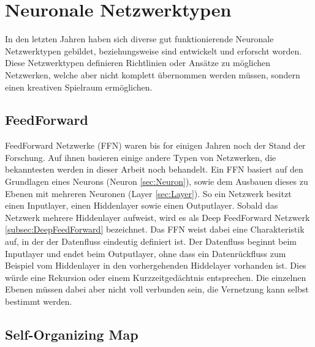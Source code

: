 
\section{Neuronale Netzwerktypen}

In den letzten Jahren haben sich diverse gut funktionierende Neuronale Netzwerktypen gebildet, beziehungsweise sind entwickelt und erforscht worden. 
Diese Netzwerktypen definieren Richtlinien oder Ansätze zu möglichen Netzwerken, welche aber nicht komplett übernommen werden müssen, sondern einen kreativen Spielraum ermöglichen. \\


\subsection{FeedForward}
\label{subsec:FeedForward}

FeedForward Netzwerke (FFN) waren bis for einigen Jahren noch der Stand der Forschung.
Auf ihnen basieren einige andere Typen von Netzwerken, die bekanntesten werden in dieser Arbeit noch behandelt.
Ein FFN basiert auf den Grundlagen eines Neurons (Neuron \ref{sec:Neuron}), sowie dem Ausbauen dieses zu Ebenen mit mehreren Neuronen (Layer \ref{sec:Layer}).
So ein Netzwerk besitzt einen Inputlayer, einen Hiddenlayer sowie einen Outputlayer.
Sobald das Netzwerk mehrere Hiddenlayer aufweist, wird es als Deep FeedForward Netzwerk \ref{subsec:DeepFeedForward} bezeichnet.
Das FFN weist dabei eine Charakteristik auf, in der der Datenfluss eindeutig definiert ist. 
Der Datenfluss beginnt beim Inputlayer und endet beim Outputlayer, ohne dass ein Datenrückfluss zum Beispiel vom Hiddenlayer in den vorhergehenden Hiddelayer vorhanden ist.
Dies würde eine Rekursion oder einem Kurzzeitgedächtnis entsprechen.
Die einzelnen Ebenen müssen dabei aber nicht voll verbunden sein, die Vernetzung kann selbst bestimmt werden.

\subsection{Self-Organizing Map}
\label{subsec:SelfOrganizingMap}

